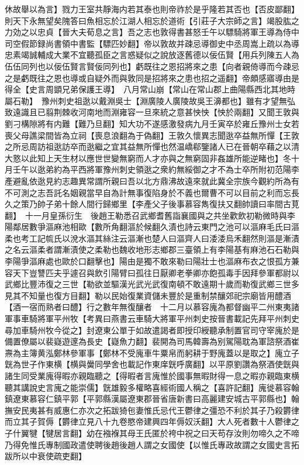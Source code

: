 休故舉以為言】戮力王室共靜海内若其泰也則帝祚於是乎隆若其否也【否皮鄙翻】則天下永無望矣隗答曰魚相忘於江湖人相忘於道術【引莊子大宗師之言】竭股肱之力効之以忠貞【晉大夫荀息之言】吾之志也敦得書甚怒壬午以驃騎將軍王導為侍中司空假節録尚書領中書監【驃匹妙翻】帝以敦故并疎忌導御史中丞周嵩上疏以為導忠素竭誠輔成大業不宜聽孤臣之言惑疑似之說放逐舊德以佞伍賢【用兵列陳五人為伍伍同列也以佞伍賢言賢佞同列也】虧既往之恩招將來之患【向者親倚導而今疎忌之是虧既往之恩也導或自疑外而與敦同是招將來之患也招之遥翻】帝頗感寤導由是得全【史言周顗兄弟保護王導】　八月常山崩【常山在常山郡上曲陽縣西北其地時屬石勒】　豫州刺史祖逖以戴淵吳士【淵廣陵人廣陵故吳王濞都也】雖有才望無弘致遠識且已翦荆棘收河南地而淵雍容一旦來統之意甚怏怏【怏於兩翻】又聞王敦與劉刁構隙將有内難【難乃旦翻】知大功不遂感激發病九月壬寅卒於雍丘豫州士女若喪父母譙梁間皆為立祠【喪息浪翻為于偽翻】王敦久懷異志聞逖卒益無所憚【王敦之所忌周訪祖逖訪卒而逖繼之宜其益無所憚也然温嶠郗鑒諸人已在晉朝卒藉之以清大憝以此知上天生材以應世世變無窮而人才亦與之無窮固非姦雄所能逆睹也】冬十月壬午以逖弟約為平西將軍豫州刺史領逖之衆約無綏御之才不為士卒所附初范陽李產避亂依逖見約志趣異常謂所親曰吾以北方鼎沸故遠來就此冀全宗族今觀約所為有不可測之志吾託名姻親當早自為計無事復陷身於不義也爾曹不可以目前之利而忘長久之策乃帥子弟十餘人間行歸鄉里【李產父子後事慕容雋復扶又翻帥讀曰率間古莧翻】　十一月皇孫衍生　後趙王勒悉召武鄉耆舊詣襄國與之共坐歡飲初勒微時與李陽鄰居數爭漚麻池相歐【數所角翻漚於候翻久漬也詩云東門之池可以漚麻毛氏曰漚柔也考工記㡆氏以涗水漚其絲注云漚漸也楚人曰漚齊人曰涹涹烏禾翻然則漚是漸漬之名云漚柔者謂漸漬使之柔勒也魏收地形志鄉郡三臺領上有李陽基有麻池石石勒與李陽爭漚麻處也歐於口翻擊也】陽由是獨不敢來勒曰陽壯士也漚麻布衣之恨孤方兼容天下豈讐匹夫乎遽召與飲引陽臂曰孤往日厭卿老拳卿亦飽孤毒手因拜參軍都尉以武鄉比豐沛復之三世【勒欲並驅漢光武光武復南頓不敢遠期十歲而勒復武鄉三世多見其不知量也復方目翻】勒以民始復業資儲未豐於是重制禁釀郊祀宗廟皆用醴酒【酒一宿而熟者曰醴】行之數年無復釀者　十二月以慕容廆為都督幽平二州東夷諸軍事車騎將軍平州牧【考異曰燕書云車騎大將軍平州刺史按晉書載記先拜平州刺史尋加車騎州牧今從之】封遼東公單于如故遣謁者即授印綬聽承制置官司守宰廆於是備置僚屬以裴嶷遊邃為長史【嶷魚力翻】裴開為司馬韓壽為别駕陽耽為軍諮祭酒崔燾為主簿黄泓鄭林參軍事【鄭林不受廆車牛粟帛而躬耕于野廆蓋以是取之】廆立子皝為世子作東横【横與黌同學舍也載記作東庠皝呼廣翻】以平原劉讚為祭酒使皝與諸生同受業廆得暇亦親臨聽之【得暇者言廆惟於國事無暇財得一息之暇亦親臨東横聽其講說史言廆之能崇儒】皝雄毅多權略喜經術國人稱之【喜許記翻】廆徙慕容翰鎮遼東慕容仁鎮平郭【平郭縣漢屬遼東郡晉省唐新書曰高麗建安城古平郭縣也】翰撫安民夷甚有威惠仁亦次之拓跋猗㐌妻惟氏忌代王鬱律之彊恐不利於其子乃殺欝律而立其子賀傉【欝律立見八十九卷愍帝建興四年傉奴沃翻】大人死者數十人鬱律之子什翼犍【犍居言翻】幼在襁褓其母王氏匿於袴中祝之曰天苟存汝則勿啼久之不啼乃得免惟氏專制國政遣使聘後趙後趙人謂之女國使【以惟氏專政故謂之女國史言拓跋所以中衰使疏吏翻】

